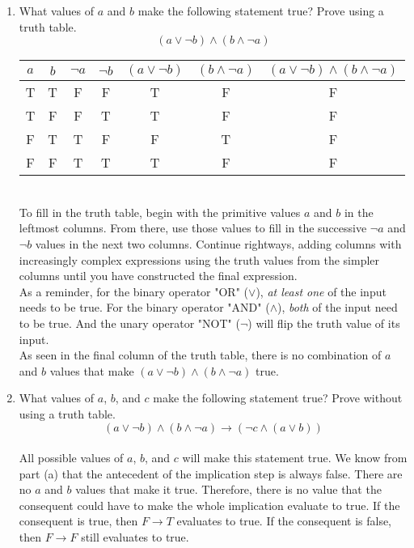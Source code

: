 \documentclass{article}
\begin{document}
\begin{enumerate}[label=\alph*.]
    \item What values of $a$ and $b$ make the following statement true? Prove using a truth table.
    $$(a \lor \neg b) \land (b \land \neg a)$$
    \begin{tabular}{|c|c|c|c|c|c|c|}
     \hline
     $a$ & $b$ & $\neg a$ & $\neg b$ & $(a\lor \neg b)$ & $(b\land\neg a)$ & $(a\lor \neg b)\land(b\land\neg a)$ \\ 
     \hline
     T & T & F & F & T & F & F \\  
     T & F & F & T & T & F & F \\
     F & T & T & F & F & T & F \\  
     F & F & T & T & T & F & F \\
     \hline
    \end{tabular}
    \\ To fill in the truth table, begin with the primitive values $a$ and $b$ in the leftmost columns. From there, use those values to fill in the successive $\neg a$ and $\neg b$ values in the next two columns. Continue rightways, adding columns with increasingly complex expressions using the truth values from the simpler columns until you have constructed the final expression.
    \\ As a reminder, for the binary operator "OR" ($\lor$), \textit{at least one} of the input needs to be true. For the binary operator "AND" ($\land$), \textit{both} of the input need to be true. And the unary operator "NOT" ($\neg$) will flip the truth value of its input.
    \\ As seen in the final column of the truth table, there is no combination of $a$ and $b$ values that make $(a\lor \neg b)\land(b\land\neg a)$ true.
    \item What values of $a$, $b$, and $c$ make the following statement true? Prove without using a truth table.
    $$(a \lor \neg b) \land (b \land \neg a)\rightarrow (\neg c\land(a\lor b))$$
    \\ All possible values of $a$, $b$, and $c$ will make this statement true. We know from part (a) that the antecedent of the implication step is always false. There are no $a$ and $b$ values that make it true. Therefore, there is no value that the consequent could have to make the whole implication evaluate to true. If the consequent is true, then $F\rightarrow T$ evaluates to true. If the consequent is false, then $F\rightarrow F$ still evaluates to true. 
\end{enumerate}
\newpage
\end{document}
